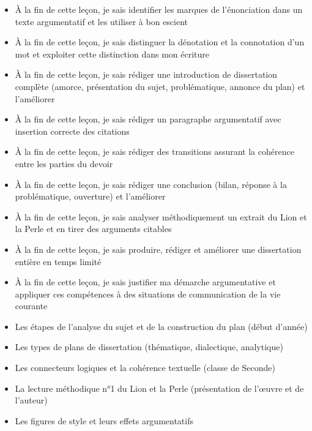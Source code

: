 \documentclass[11pt]{article}
\begin{document}
\begin{objectifs}
\begin{itemize}
\item À la fin de cette leçon, je sais identifier les marques de l'énonciation dans un texte argumentatif et les utiliser à bon escient
\item À la fin de cette leçon, je sais distinguer la dénotation et la connotation d'un mot et exploiter cette distinction dans mon écriture
\item À la fin de cette leçon, je sais rédiger une introduction de dissertation complète (amorce, présentation du sujet, problématique, annonce du plan) et l'améliorer
\item À la fin de cette leçon, je sais rédiger un paragraphe argumentatif avec insertion correcte des citations
\item À la fin de cette leçon, je sais rédiger des transitions assurant la cohérence entre les parties du devoir
\item À la fin de cette leçon, je sais rédiger une conclusion (bilan, réponse à la problématique, ouverture) et l'améliorer
\item À la fin de cette leçon, je sais analyser méthodiquement un extrait du Lion et la Perle et en tirer des arguments citables
\item À la fin de cette leçon, je sais produire, rédiger et améliorer une dissertation entière en temps limité
\item À la fin de cette leçon, je sais justifier ma démarche argumentative et appliquer ces compétences à des situations de communication de la vie courante
\end{itemize}
\end{objectifs}

\begin{prerequis}
\begin{itemize}
\item Les étapes de l'analyse du sujet et de la construction du plan (début d'année)
\item Les types de plans de dissertation (thématique, dialectique, analytique)
\item Les connecteurs logiques et la cohérence textuelle (classe de Seconde)
\item La lecture méthodique n°1 du Lion et la Perle (présentation de l'œuvre et de l'auteur)
\item Les figures de style et leurs effets argumentatifs
\end{itemize}
\end{prerequis}
\end{document}
